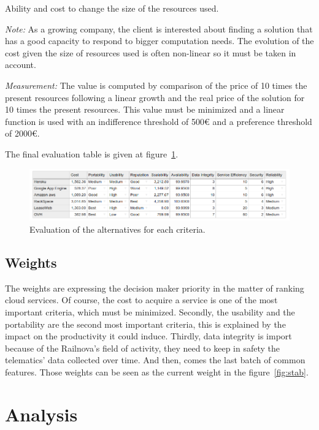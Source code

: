\documentclass[a4paper,11pt]{article}
\begin{document}
\begin{description}[parsep=10pt,listparindent=\parindent,labelindent=\parindent,font=$\bullet$\ ]
  \item[Scalability:] Ability and cost to change the size of the resources used.
    \par \emph{Note:} As a growing company, the client is interested about finding a solution that has a good capacity to respond to bigger computation needs. The evolution of the cost given the size of resources used is often non-linear so it must be taken in account.
    \par \emph{Measurement:} The value is computed by comparison of the price of 10 times the present resources following a linear growth and the real price of the solution for 10 times the present resources. This value must be minimized and a linear function is used with an indifference threshold of 500\euro{} and a preference threshold of 2000\euro{}.

\end{description}

The final evaluation table is given at figure~\ref{fig:eval}.

\begin{figure}[h]
  \center
  \includegraphics[width=\textwidth]{img/Result/evaluation.png}
  \caption{Evaluation of the alternatives for each criteria.}
  \label{fig:eval}
\end{figure}

\subsection{Weights}
The weights are expressing the decision maker priority in the matter of ranking cloud services. Of course, the cost to acquire a service is one of the most important criteria, which must be minimized. Secondly, the usability and the portability are the second most important criteria, this is explained by the impact on the productivity it could induce. Thirdly, data integrity is import because of the Railnova's field of activity, they need to keep in safety the telematics' data collected over time. And then, comes the last batch of common features. Those weights can be seen as the current weight in the figure~\ref{fig:stab}.

\section{Analysis}
\end{document}
